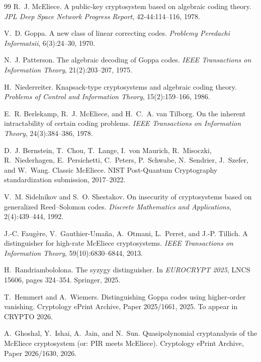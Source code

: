 \begin{thebibliography}{99}
 R.~J. McEliece.
\newblock A public-key cryptosystem based on algebraic coding theory.
\newblock \emph{JPL Deep Space Network Progress Report}, 42-44:114--116, 1978.

 V.~D. Goppa.
\newblock A new class of linear correcting codes.
\newblock \emph{Problemy Peredachi Informatsii}, 6(3):24--30, 1970.

 N.~J. Patterson.
\newblock The algebraic decoding of Goppa codes.
\newblock \emph{IEEE Transactions on Information Theory}, 21(2):203--207, 1975.

 H.~Niederreiter.
\newblock Knapsack-type cryptosystems and algebraic coding theory.
\newblock \emph{Problems of Control and Information Theory}, 15(2):159--166, 1986.

 E.~R. Berlekamp, R.~J. McEliece, and H.~C.~A. van Tilborg.
\newblock On the inherent intractability of certain coding problems.
\newblock \emph{IEEE Transactions on Information Theory}, 24(3):384--386, 1978.

 D.~J. Bernstein, T.~Chou, T.~Lange, I.~von Maurich, R.~Misoczki, R.~Niederhagen, E.~Persichetti, C.~Peters, P.~Schwabe, N.~Sendrier, J.~Szefer, and W.~Wang.
\newblock Classic McEliece.
\newblock NIST Post-Quantum Cryptography standardization submission, 2017--2022.

 V.~M. Sidelnikov and S.~O. Shestakov.
\newblock On insecurity of cryptosystems based on generalized Reed--Solomon codes.
\newblock \emph{Discrete Mathematics and Applications}, 2(4):439--444, 1992.

 J.-C. Faug\`{e}re, V.~Gauthier-Uma\~{n}a, A.~Otmani, L.~Perret, and J.-P. Tillich.
\newblock A distinguisher for high-rate McEliece cryptosystems.
\newblock \emph{IEEE Transactions on Information Theory}, 59(10):6830--6844, 2013.

 H.~Randriambololona.
\newblock The syzygy distinguisher.
\newblock In \emph{EUROCRYPT 2025}, LNCS 15606, pages 324--354. Springer, 2025.

 T.~Hemmert and A.~Wiemers.
\newblock Distinguishing Goppa codes using higher-order vanishing.
\newblock Cryptology ePrint Archive, Paper 2025/1661, 2025. To appear in CRYPTO 2026.

 A.~Ghoshal, Y.~Ishai, A.~Jain, and N.~Sun.
\newblock Quasipolynomial cryptanalysis of the McEliece cryptosystem (or: PIR meets McEliece).
\newblock Cryptology ePrint Archive, Paper 2026/1630, 2026.


\end{thebibliography}
